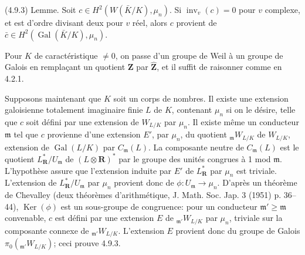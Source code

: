 \documentclass[9pt,twoside]{extarticle}
\begin{document}
{(4.9.3) Lemme. Soit \(c\in H^2(W(\bar K/K),\mu_n)\). Si \(\operatorname{inv}_v(c)=0\) pour \(v\) complexe, et est d’ordre divisant deux pour \(v\) réel, alors \(c\) provient de \(\bar c\in H^2(\operatorname{Gal}(\bar K/K),\mu_n)\).\par

Pour \(K\) de caractéristique \(\ne0\), on passe d’un groupe de Weil à un groupe de Galois en remplaçant un quotient \(\mathbf Z\) par \(\widehat{\mathbf Z}\), et il suffit de raisonner comme en 4.2.1.\par

Supposons maintenant que \(K\) soit un corps de nombres. Il existe une extension galoisienne totalement imaginaire finie \(L\) de \(K\), contenant \(\mu_n\) si on le désire, telle que \(c\) soit défini par une extension de \(W_{L/K}\) par \(\mu_n\). Il existe même un conducteur \(\mathfrak m\) tel que \(c\) provienne d’une extension \(E'\), par \(\mu_n\), du quotient \({}_{\mathfrak m}W_{L/K}\) de \(W_{L/K}\), extension de \(\operatorname{Gal}(L/K)\) par \(C_{\mathfrak m}(L)\). La composante neutre de \(C_{\mathfrak m}(L)\) est le quotient \(L_{\mathbf R}^*/U_{\mathfrak m}\) de \((L\otimes\mathbf R)^*\) par le groupe des unités congrues à 1 mod \(\mathfrak m\). L’hypothèse assure que l’extension induite par \(E'\) de \(L_{\mathbf R}^*\) par \(\mu_n\) est triviale. L’extension de \(L_{\mathbf R}^*/U_{\mathfrak m}\) par \(\mu_n\) provient donc de \(\phi:U_{\mathfrak m}\to\mu_n\). D’après un théorème de Chevalley (deux théorèmes d’arithmétique, J. Math. Soc. Jap. 3 (1951) p. 36--44), \(\operatorname{Ker}(\phi)\) est un sous-groupe de congruence: pour un conducteur \(\mathfrak m'\ge\mathfrak m\) convenable, \(c\) est défini par une extension \(E\) de \({}_{\mathfrak m'}W_{L/K}\) par \(\mu_n\), triviale sur la composante connexe de \({}_{\mathfrak m'}W_{L/K}\). L’extension \(E\) provient donc du groupe de Galois \(\pi_0({}_{\mathfrak m'}W_{L/K})\); ceci prouve 4.9.3.\par
}
\end{document}
